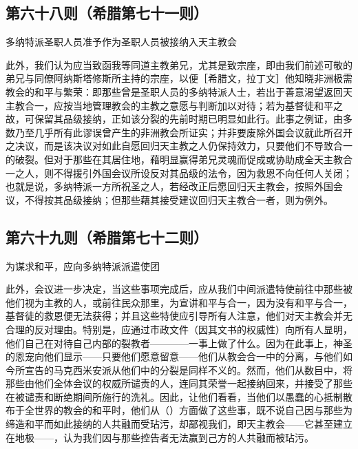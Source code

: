 
\subsection{第六十八则（希腊第七十一则）}

多纳特派圣职人员准予作为圣职人员被接纳入天主教会\par

此外，我们认为应当致函我等同道主教弟兄，尤其是致宗座，即由我们前述可敬的弟兄与同僚阿纳斯塔修斯所主持的宗座，以便［希腊文，拉丁文］他知晓非洲极需教会的和平与繁荣：即那些曾是圣职人员的多纳特派人士，若出于善意渴望返回天主教合一，应按当地管理教会的主教之意愿与判断加以对待；若为基督徒和平之故，可保留其品级接纳，正如该分裂的先前时期已明显如此行。此事之例证，由多数乃至几乎所有此谬误曾产生的非洲教会所证实；并非要废除外国会议就此所召开之决议，而是该决议对如此自愿回归天主教之人仍保持效力，只要他们不导致合一的破裂。但对于那些在其居住地，藉明显赢得弟兄灵魂而促成或协助成全天主教合一之人，则不得援引外国会议所设反对其品级的法令，因为救恩不向任何人关闭；也就是说，多纳特派一方所祝圣之人，若经改正后愿回归天主教会，按照外国会议，不得按其品级接纳；但那些藉其接受建议回归天主教合一者，则为例外。\par


\subsection{第六十九则（希腊第七十二则）}

为谋求和平，应向多纳特派派遣使团\par

此外，会议进一步决定，当这些事项完成后，应从我们中间派遣特使前往中那些被他们视为主教的人，或前往民众那里，为宣讲和平与合一，因为没有和平与合一，基督徒的救恩便无法获得；并且这些特使应引导所有人注意，他们对天主教会并无合理的反对理由。特别是，应通过市政文件（因其文书的权威性）向所有人显明，他们自己在对待自己内部的裂教者————一事上做了什么。因为在此事上，神圣的恩宠向他们显示——只要他们愿意留意——他们从教会合一中的分离，与他们如今所宣告的马克西米安派从他们中的分裂是同样不义的。然而，他们从数目中，将那些由他们全体会议的权威所谴责的人，连同其荣誉一起接纳回来，并接受了那些在被谴责和断绝期间所施行的洗礼。因此，让他们看看，当他们以愚蠢的心抵制散布于全世界的教会的和平时，他们从（）方面做了这些事，既不说自己因与那些为缔造和平而如此接纳的人共融而受玷污，却鄙视我们，即天主教会——它甚至建立在地极——，认为我们因与那些控告者无法赢到己方的人共融而被玷污。\par

